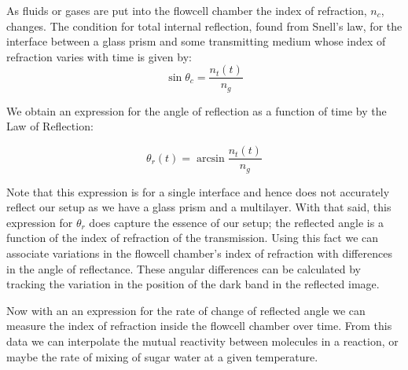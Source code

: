 \begin{flushleft}
	\hspace{0.5in}
	As fluids or gases are put into the flowcell chamber the index of refraction, $n_c$, changes. The condition for total internal reflection, found from Snell's law, for the interface between a glass prism and some transmitting medium whose index of refraction varies with time is given by:
	\[
			\sin{\theta_c} = \frac{n_t(t)}{n_g}
	\]

	We obtain an expression for the angle of reflection as a function of time by the Law of Reflection:

	\[
			\theta_r(t) = \arcsin{\frac{n_t(t)}{n_g}}
	\]

	\hspace{0.5in}
	Note that this expression is for a single interface and hence does not accurately reflect our setup as we have a glass prism and a multilayer. With that said, this expression for $\theta_r$ does capture the essence of our setup; the reflected angle is a function of the index of refraction of the transmission. Using this fact we can associate variations in the flowcell chamber's index of refraction with differences in the angle of reflectance. These angular differences can be calculated by tracking the variation in the position of the dark band in the reflected image.

	\hspace{0.5in}
	Now with an an expression for the rate of change of reflected angle we can measure the index of refraction inside the flowcell chamber over time. From this data we can interpolate the mutual reactivity between molecules in a reaction, or maybe the rate of mixing of sugar water at a given temperature.

	\pagestyle{empty}
\end{flushleft}
